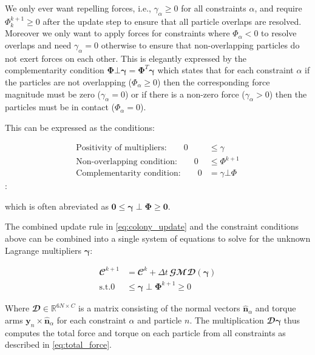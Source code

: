 \documentclass[conference]{IEEEtran}
\begin{document}
We only ever want repelling forces, i.e., $\gamma_\alpha \geq 0$ for all constraints $\alpha$, and require $\Phi_{k}^{k+1} \geq 0$ after the update step to ensure that all particle overlaps are resolved. Moreover we only want to apply forces for constraints where $\Phi_{\alpha} < 0$ to resolve overlaps and need $\gamma_\alpha = 0$ otherwise to ensure that non-overlapping particles do not exert forces on each other. This is elegantly expressed by the complementarity condition $\mathbf{\Phi} \bot \mathbf{\gamma} = \mathbf{\Phi}^T \mathbf{\gamma}$ which states that for each constraint $\alpha$ if the particles are not overlapping ($\Phi_\alpha \geq 0$) then the corresponding force magnitude must be zero ($\gamma_\alpha = 0$) or if there is a non-zero force ($\gamma_\alpha > 0$) then the particles must be in contact ($\Phi_\alpha = 0$).

This can be expressed as the conditions:

\begin{align}
    \text{Positivity of multipliers:} \qquad  0 & \leq \gamma        \\
    \text{Non-overlapping condition:} \qquad  0 & \leq \Phi^{k+1}    \\
    \text{Complementarity condition:} \qquad  0 & = \gamma \bot \Phi
\end{align}:

which is often abreviated as $\mathbf{0} \leq \mathbf{\gamma} \perp \mathbf{\Phi} \geq \mathbf{0}$.


The combined update rule in \autoref{eq:colony_update} and the constraint conditions above can be combined into a single system of equations to solve for the unknown Lagrange multipliers $\mathbf{\gamma}$:

\begin{align}
    \mathbfcal{C}^{k+1} & = \mathbfcal{C}^k + \Delta t \, \mathbfcal{G}\mathbfcal{M} \mathbfcal{D}(\mathbf{\gamma}) \\
    \text{s.t.} 0       & \leq \mathbf{\gamma} \perp \mathbf{\Phi}^{k+1} \geq 0
\end{align}

Where $\mathbfcal{D} \in \mathbb{R}^{6N \times C}$ is a matrix consisting of the normal vectors $\hat{\mathbf{n}}_\alpha$ and torque arms $\mathbf{y}_n \times \hat{\mathbf{n}}_\alpha$ for each constraint $\alpha$ and particle $n$. The multiplication $\mathbfcal{D}\mathbf{\gamma}$ thus computes the total force and torque on each particle from all constraints as described in \autoref{eq:total_force}.
\end{document}
